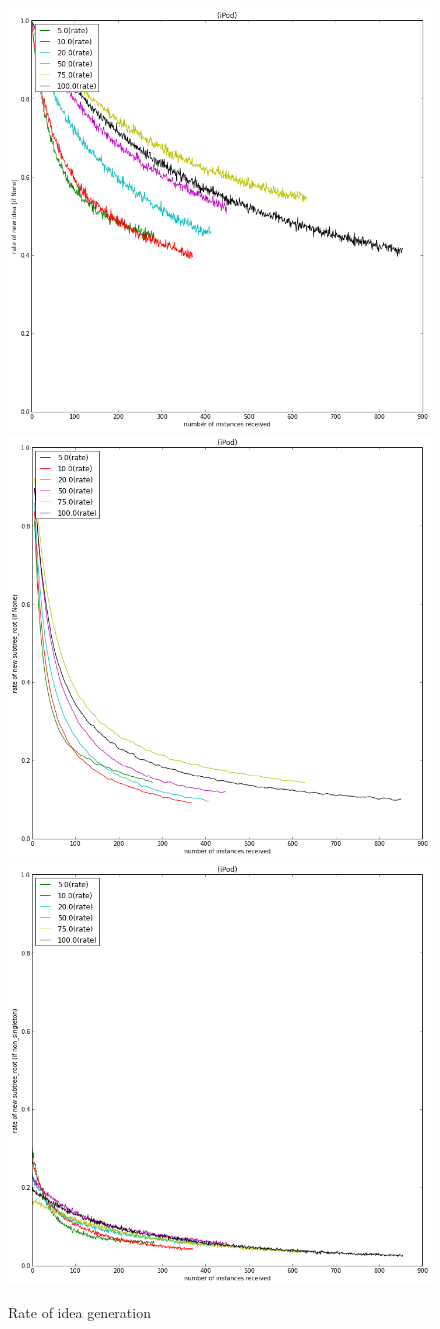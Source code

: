 \begin{figure}[h!]
    \centering
    \includegraphics[width=0.7\columnwidth]{rate_new_idea_over_time}
    \includegraphics[width=0.7\columnwidth]{rate_new_category_over_time}
    \includegraphics[width=0.7\columnwidth]{rate_new_ns_category_over_time}
    \caption{Rate of idea generation}
\end{figure}

